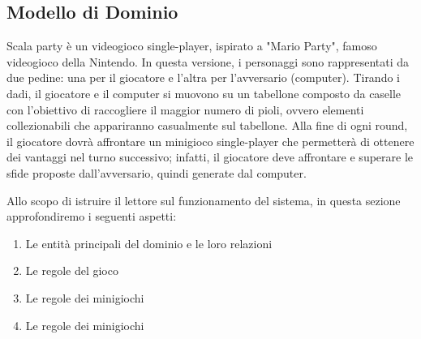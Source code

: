 \subsection{Modello di Dominio}
Scala party è un videogioco single-player, ispirato a "Mario Party",
famoso videogioco della Nintendo. In questa versione, i personaggi 
sono rappresentati da due pedine: una per il giocatore e l'altra per
l'avversario (computer). Tirando i dadi, il giocatore e il computer 
si muovono su un tabellone composto da caselle con l'obiettivo di
raccogliere il maggior numero di pioli, ovvero elementi collezionabili
che appariranno casualmente sul tabellone. Alla fine di ogni round,
il giocatore dovrà affrontare un minigioco single-player che permetterà
di ottenere dei vantaggi nel turno successivo; infatti, il giocatore
deve affrontare e superare le sfide proposte dall'avversario, quindi 
generate dal computer.

Allo scopo di istruire il lettore sul funzionamento del sistema,
in questa sezione approfondiremo i seguenti aspetti:
\begin{enumerate}
    \item Le entità principali del dominio e le loro relazioni
    \item Le regole del gioco
    \item Le regole dei minigiochi
    \item Le regole dei minigiochi
\end{enumerate}
